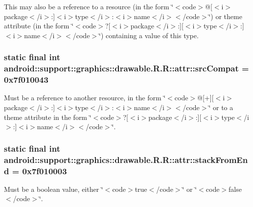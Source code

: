 This may also be a reference to a resource (in the form \char`\"{}$<$code$>$@\mbox{[}$<$i$>$package$<$/i$>$:\mbox{]}$<$i$>$type$<$/i$>$:$<$i$>$name$<$/i$>$$<$/code$>$\char`\"{}) or theme attribute (in the form \char`\"{}$<$code$>$?\mbox{[}$<$i$>$package$<$/i$>$:\mbox{]}\mbox{[}$<$i$>$type$<$/i$>$:\mbox{]}$<$i$>$name$<$/i$>$$<$/code$>$\char`\"{}) containing a value of this type. \hypertarget{classandroid_1_1support_1_1graphics_1_1drawable_1_1_r_1_1attr_aa42ed699128e7315d09fd3247def5d5}{
\subsubsection[{srcCompat}]{\setlength{\rightskip}{0pt plus 5cm}static final int android::support::graphics::drawable.R.R::attr::srcCompat = 0x7f010043}}
\label{classandroid_1_1support_1_1graphics_1_1drawable_1_1_r_1_1attr_aa42ed699128e7315d09fd3247def5d5}


Must be a reference to another resource, in the form \char`\"{}$<$code$>$@\mbox{[}+\mbox{]}\mbox{[}$<$i$>$package$<$/i$>$:\mbox{]}$<$i$>$type$<$/i$>$:$<$i$>$name$<$/i$>$$<$/code$>$\char`\"{} or to a theme attribute in the form \char`\"{}$<$code$>$?\mbox{[}$<$i$>$package$<$/i$>$:\mbox{]}\mbox{[}$<$i$>$type$<$/i$>$:\mbox{]}$<$i$>$name$<$/i$>$$<$/code$>$\char`\"{}. \hypertarget{classandroid_1_1support_1_1graphics_1_1drawable_1_1_r_1_1attr_63532934fdd61a1c1513cacc05ebfa90}{
\subsubsection[{stackFromEnd}]{\setlength{\rightskip}{0pt plus 5cm}static final int android::support::graphics::drawable.R.R::attr::stackFromEnd = 0x7f010003}}
\label{classandroid_1_1support_1_1graphics_1_1drawable_1_1_r_1_1attr_63532934fdd61a1c1513cacc05ebfa90}


Must be a boolean value, either \char`\"{}$<$code$>$true$<$/code$>$\char`\"{} or \char`\"{}$<$code$>$false$<$/code$>$\char`\"{}. 

